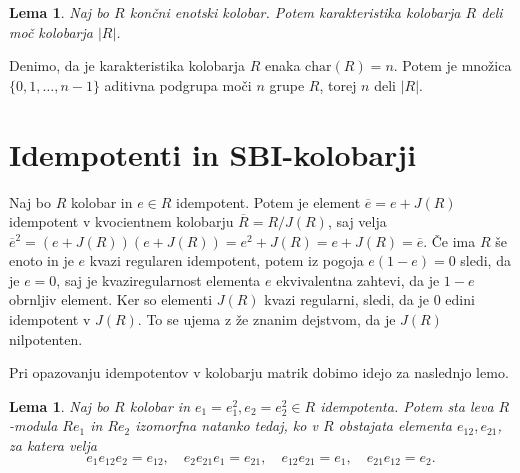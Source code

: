 \documentclass[a4paper, 12pt]{amsart}
\theoremstyle{definition} %
\theoremstyle{plain} %
\newtheorem{lema}[definicija]{Lema}
\begin{document}
\begin{lema}
\label{charDeliMocKolobarja}
Naj bo $R$ končni enotski kolobar. Potem karakteristika kolobarja $R$ deli moč kolobarja $|R|$.
\end{lema}

\proof
Denimo, da je karakteristika kolobarja $R$ enaka $\textrm{char}(R) = n$. Potem je množica $\{0,1,\dots,n-1\}$ aditivna podgrupa moči $n$ grupe $R$, torej $n$ deli $|R|$.
\endproof

\section{Idempotenti in SBI-kolobarji}

Naj bo $R$ kolobar in $e\in R$ idempotent. Potem je element $\overline{e} = e + J(R)$ idempotent v kvocientnem kolobarju $\overline{R}=R/J(R)$, saj velja $\overline{e}^2 = (e+J(R)) (e+J(R)) = e^2 + J(R) = e+J(R) = \overline{e}$. Če ima $R$ še enoto in je $e$ kvazi regularen idempotent, potem iz pogoja $e(1-e) = 0$ sledi, da je $e=0$, saj je kvaziregularnost elementa $e$ ekvivalentna zahtevi, da je $1-e$ obrnljiv element. Ker so elementi $J(R)$ kvazi regularni, sledi, da je $0$ edini idempotent v $J(R)$. To se ujema z že znanim dejstvom, da je $J(R)$ nilpotenten. 

Pri opazovanju idempotentov v kolobarju matrik dobimo idejo za naslednjo lemo.

\begin{lema}
\label{izomorfniPodmoduliElementi}
Naj bo $R$ kolobar in $e_1 = e_1^2 , e_2=e_2^2\in R$ idempotenta. Potem sta leva $R$-modula $Re_1$ in $Re_2$ izomorfna natanko tedaj, ko v $R$ obstajata elementa $e_{12}, e_{21}$, za katera velja
$$
e_1 e_{12} e_2 = e_{12}, \quad e_2 e_{21} e_1 = e_{21}, \quad e_{12}e_{21} = e_1, \quad e_{21}e_{12} = e_2.
$$
\end{lema}
\end{document}
